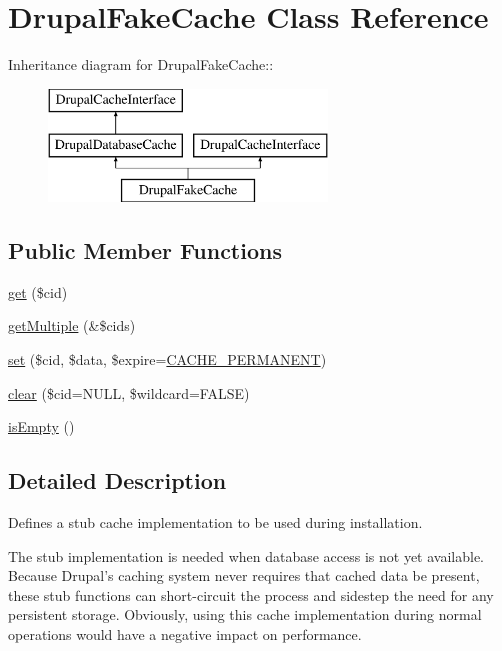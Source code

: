 \hypertarget{classDrupalFakeCache}{
\section{DrupalFakeCache Class Reference}
\label{classDrupalFakeCache}
}
Inheritance diagram for DrupalFakeCache::\begin{figure}[H]
\begin{center}
\leavevmode
\includegraphics[height=3cm]{classDrupalFakeCache}
\end{center}
\end{figure}
\subsection*{Public Member Functions}
\begin{DoxyCompactItemize}
\item 
\hyperlink{classDrupalFakeCache_aaab8fb6e1a78691e81e0f3d48d4edbad}{get} (\$cid)
\item 
\hyperlink{classDrupalFakeCache_a9ca8ecb251e83f3d30beb2f6722ef746}{getMultiple} (\&\$cids)
\item 
\hyperlink{classDrupalFakeCache_a54b3264101045168404dc3cedcfce970}{set} (\$cid, \$data, \$expire=\hyperlink{bootstrap_8inc_ad987330fff5fa7c75800762ddedf300c}{CACHE\_\-PERMANENT})
\item 
\hyperlink{classDrupalFakeCache_a524fb90590bc66f8dd8960e6f93de943}{clear} (\$cid=NULL, \$wildcard=FALSE)
\item 
\hyperlink{classDrupalFakeCache_a78bf2c373a0204a24bd809c0f27e7a4e}{isEmpty} ()
\end{DoxyCompactItemize}


\subsection{Detailed Description}
Defines a stub cache implementation to be used during installation.

The stub implementation is needed when database access is not yet available. Because Drupal's caching system never requires that cached data be present, these stub functions can short-\/circuit the process and sidestep the need for any persistent storage. Obviously, using this cache implementation during normal operations would have a negative impact on performance. 

